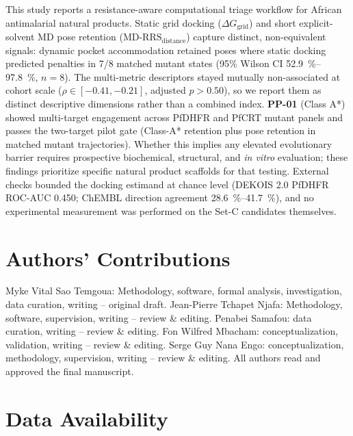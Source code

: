 \documentclass[11pt,a4paper]{article}
\begin{document}
This study reports a resistance-aware computational triage workflow for African antimalarial natural products. Static grid docking ($\Delta G_{\mathrm{grid}}$) and short explicit-solvent MD pose retention ($\mathrm{MD\text{-}RRS}_{\mathrm{distance}}$) capture distinct, non-equivalent signals: dynamic pocket accommodation retained poses where static docking predicted penalties in 7/8 matched mutant states (95\% Wilson CI \qtyrange{52.9}{97.8}{\percent}, $n=\num{8}$). The multi-metric descriptors stayed mutually non-associated at cohort scale ($\rho \in [-0.41, -0.21]$, adjusted $p > 0.50$), so we report them as distinct descriptive dimensions rather than a combined index. \textbf{PP-01} (Class A*) showed multi-target engagement across PfDHFR and PfCRT mutant panels and passes the two-target pilot gate (Class-A* retention plus pose retention in matched mutant trajectories). Whether this implies any elevated evolutionary barrier requires prospective biochemical, structural, and \textit{in vitro} evaluation; these findings prioritize specific natural product scaffolds for that testing. External checks bounded the docking estimand at chance level (DEKOIS 2.0 PfDHFR ROC-AUC \num{0.450}; ChEMBL direction agreement \qtyrange{28.6}{41.7}{\percent}), and no experimental measurement was performed on the Set-C candidates themselves.


\section*{Authors' Contributions}

Myke Vital Sao Temgoua: Methodology, software, formal analysis, investigation, data curation, writing -- original draft. Jean-Pierre Tchapet Njafa: Methodology, software, supervision, writing -- review \& editing. Penabei Samafou: data curation, writing -- review \& editing. Fon Wilfred Mbacham: conceptualization, validation, writing -- review \& editing. Serge Guy Nana Engo: conceptualization, methodology, supervision, writing -- review \& editing. All authors read and approved the final manuscript.

\section*{Data Availability}
\end{document}
